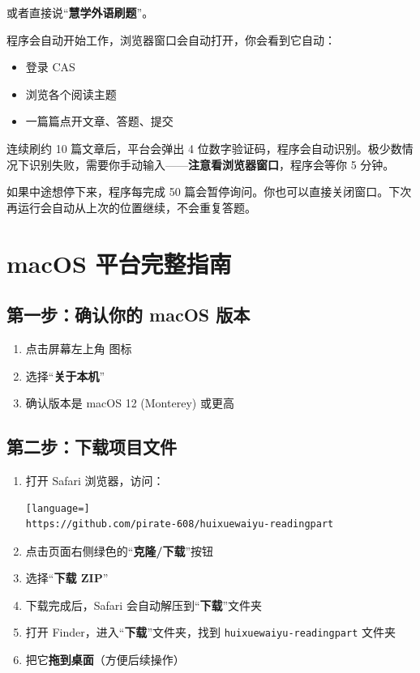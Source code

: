 \documentclass[12pt,a4paper]{ctexart}
\begin{document}
或者直接说``\textbf{慧学外语刷题}''。

程序会自动开始工作，浏览器窗口会自动打开，你会看到它自动：
\begin{itemize}[nosep]
  \item 登录 CAS
  \item 浏览各个阅读主题
  \item 一篇篇点开文章、答题、提交
\end{itemize}

\bigskip

\begin{warnbox}
  连续刷约 10 篇文章后，平台会弹出 4
  位数字验证码，程序会自动识别。极少数情况下识别失败，需要你手动输入——\textbf{注意看浏览器窗口}，程序会等你 5 分钟。
\end{warnbox}

\begin{tipbox}
  如果中途想停下来，程序每完成 50 篇会暂停询问。你也可以直接关闭窗口。下次再运行会自动从上次的位置继续，不会重复答题。
\end{tipbox}

\newpage
\section{macOS 平台完整指南}

\subsection{第一步：确认你的 macOS 版本}

\begin{enumerate}[nosep]
  \item 点击屏幕左上角 \faApple{} 图标
  \item 选择``\textbf{关于本机}''
  \item 确认版本是 macOS 12 (Monterey) 或更高
\end{enumerate}

\subsection{第二步：下载项目文件}

\begin{enumerate}
  \item 打开 Safari 浏览器，访问：
    \begin{lstlisting}[language=]
https://github.com/pirate-608/huixuewaiyu-readingpart
\end{lstlisting}
  \item 点击页面右侧绿色的``\textbf{克隆/下载}''按钮
  \item 选择``\textbf{下载 ZIP}''
  \item 下载完成后，Safari 会自动解压到``\textbf{下载}''文件夹
  \item 打开 Finder，进入``\textbf{下载}''文件夹，找到
    \texttt{huixuewaiyu-readingpart} 文件夹
  \item 把它\textbf{拖到桌面}（方便后续操作）
\end{enumerate}
\end{document}
